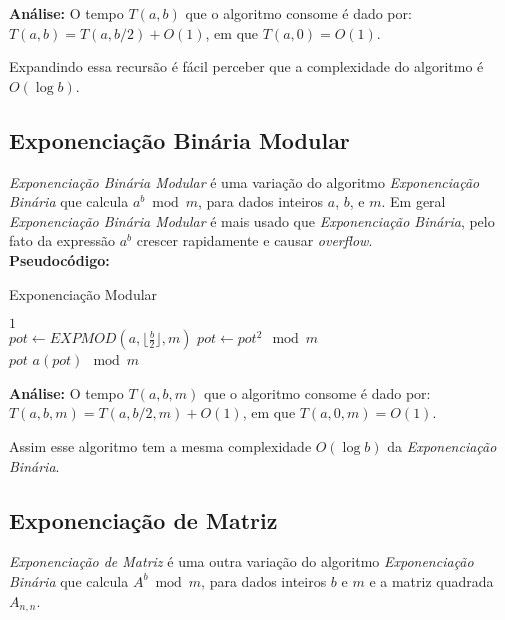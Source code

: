 \textbf{Análise:}
O tempo $T(a,b)$ que o algoritmo consome é dado por: $T(a,b) = T(a,b/2)+O(1)$, em que $T(a,0) = O(1)$.

Expandindo essa recursão é fácil perceber que a complexidade do algoritmo é $O(\log b)$.


\subsection{Exponenciação Binária Modular}

\textit{Exponenciação Binária Modular} é uma variação do algoritmo \textit{Exponenciação Binária} que calcula $a^b\bmod m$, para dados inteiros $a$, $b$, e $m$. Em geral \textit{Exponenciação Binária Modular} é mais usado que \textit{Exponenciação Binária}, 
pelo fato da expressão $a^b$ crescer rapidamente e causar \textit{overflow}.\\

\textbf{Pseudocódigo:}
\begin{algorithm}
\caption{Exponenciação Modular}\label{exponenciacao_modular}
\begin{algorithmic}[1]
\State \Return $1$
\EndIf 
\\
\State $pot \gets EXPMOD(a, \lfloor \frac{b}{2} \rfloor, m)$
\State $pot \gets pot^2 \mod m$
\\
\State \Return $pot$
\Else
\State \Return $a(pot) \mod m$
\EndIf

\EndProcedure
\end{algorithmic}
\end{algorithm}


\textbf{Análise:}
O tempo $T(a,b,m)$ que o algoritmo consome é dado por: $T(a,b,m) = T(a,b/2,m)+O(1)$, em que $T(a,0,m) = O(1)$.

Assim esse algoritmo tem a mesma complexidade $O(\log b)$ da \textit{Exponenciação Binária}.

\subsection{Exponenciação de Matriz}

\textit{Exponenciação de Matriz} é uma outra variação do algoritmo \textit{Exponenciação Binária} que calcula $A^b\bmod m$, para dados inteiros $b$ e $m$ e a matriz quadrada $A_{n,n}$. 

